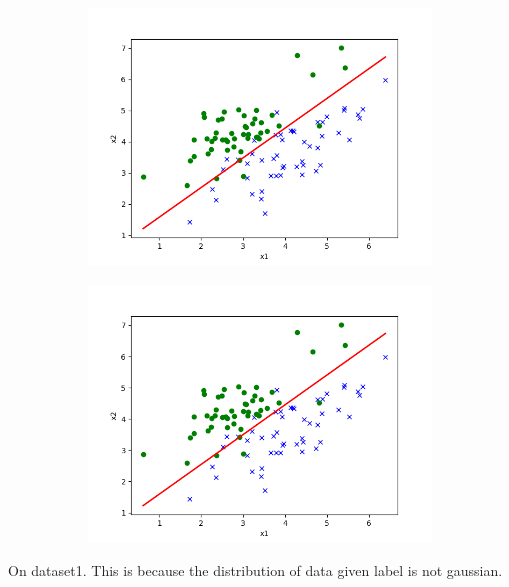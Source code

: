 \begin{answer}
\begin{figure}[htbp]
    \begin{subfigure}[b]{0.5\linewidth}
        \centering
        \includegraphics[width=\linewidth]{pics/p01b_2.png}
    \end{subfigure}
    \begin{subfigure}[b]{0.5\linewidth}
        \centering
        \includegraphics[width=\linewidth]{pics/p01e_2.png}
    \end{subfigure}

\end{figure}

On dataset1. This is because the distribution of data given label is not gaussian.

\end{answer}
